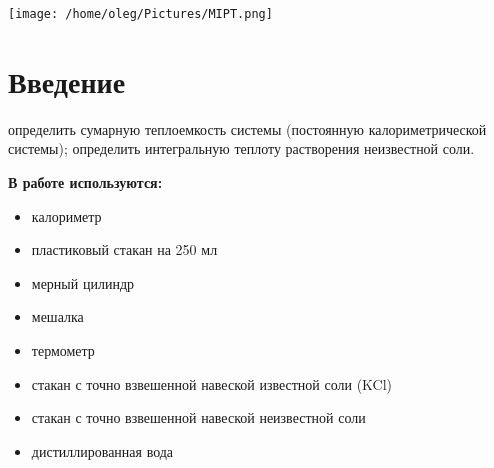 \documentclass[a4paper, 12pt]{article}
\begin{document}
\begin{titlepage}
    \title{}
    \author{ Рябов Олег Евгеньевич \\
    Шистко Степан Александрович \\
    Группа Б04-302}
    \date{\today}
    \maketitle
    \vfill
    \begin{center}
        \texttt{[image: /home/oleg/Pictures/MIPT.png]}
    \end{center}
\end{titlepage}

\setcounter{page}{2}
\tableofcontents


\newpage


\section{Введение}
\large \textbf{} определить сумарную теплоемкость системы (постоянную калориметрической системы); определить интегральную теплоту растворения неизвестной соли.
	\par \vspace{0.3 cm}
	\textbf{{В работе используются:}}
        \begin{itemize}
           \item калориметр
           \item пластиковый стакан на 250 мл
           \item мерный цилиндр
           \item мешалка
           \item термометр
           \item стакан с точно взвешенной навеской известной соли (KCl)
           \item стакан с точно взвешенной навеской неизвестной соли
           \item дистиллированная вода
        \end{itemize}  
\end{document}
